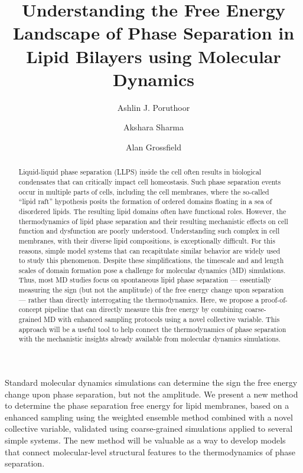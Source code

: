 \documentclass{biophys-new}
\title{Understanding the Free Energy Landscape of Phase Separation in Lipid Bilayers using Molecular Dynamics}
\author[1]{Ashlin J. Poruthoor}
\author[1]{Akshara Sharma}
\author[1,*]{Alan Grossfield}
\affil[1]{Department of Biochemistry and Biophysics, University of Rochester Medical Center, Rochester, NY 14642}
\providecommand{\DIFaddtex}[1]{{\protect\color{blue}\uwave{#1}}} %
\providecommand{\DIFaddbegin}{} %
\providecommand{\DIFaddend}{} %
\providecommand{\DIFadd}[1]{\texorpdfstring{\DIFaddtex{#1}}{#1}} %
\newcommand{\DIFaddincludegraphics}[2][]{{\color{blue}\fbox{\DIFOincludegraphics[#1]{#2}}}} %
\DeclareRobustCommand{\DIFaddbegin}{\DIFOaddbegin \let\includegraphics\DIFaddincludegraphics} %
\DeclareRobustCommand{\DIFaddend}{\DIFOaddend \let\includegraphics\DIFOincludegraphics} %
\begin{document}
\begin{frontmatter}
    \begin{abstract}

        Liquid-liquid phase separation (LLPS) inside the cell often results in biological condensates that can critically impact
        cell homeostasis. Such phase separation events occur in multiple parts of cells, including
        the cell membranes, where the so-called ``lipid raft'' hypothesis posits the formation of ordered domains floating in a sea
        of disordered lipids. The resulting lipid domains often have functional roles.
        However, the thermodynamics of lipid phase separation and their resulting
        mechanistic effects on cell function and dysfunction are poorly understood. Understanding such complex  \DIFaddbegin \DIFadd{phenomena }\DIFaddend in cell
        membranes, with their diverse lipid compositions, is exceptionally difficult. For this reasons, simple model systems that can recapitulate similar behavior are
        widely used to study this phenomenon. Despite these simplifications, the timescale and and length scales of domain formation
        pose a challenge for molecular dynamics (MD) simulations.
        Thus, most MD studies focus on spontaneous lipid phase separation --- essentially measuring the sign (but not the amplitude) of the free energy change upon separation --- rather than directly interrogating the thermodynamics.  Here, we propose a proof-of-concept pipeline that can
        directly measure this free energy by combining coarse-grained MD with enhanced sampling protocols using a novel collective variable. This approach will be a useful tool to help connect the thermodynamics of phase separation with the mechanistic insights already available from molecular dynamics simulations.

    \end{abstract}

    \begin{sigstatement}

        Standard molecular dynamics simulations can determine the sign the free energy change upon phase separation, but not the amplitude. We present a new method to determine the phase separation free energy for lipid membranes, based on a enhanced sampling using the weighted ensemble method combined with a novel collective variable, validated using coarse-grained simulations applied to several simple systems. The new method will be valuable as a way to develop models that connect molecular-level structural features to the thermodynamics of phase separation.

    \end{sigstatement}

\end{frontmatter}
\end{document}
